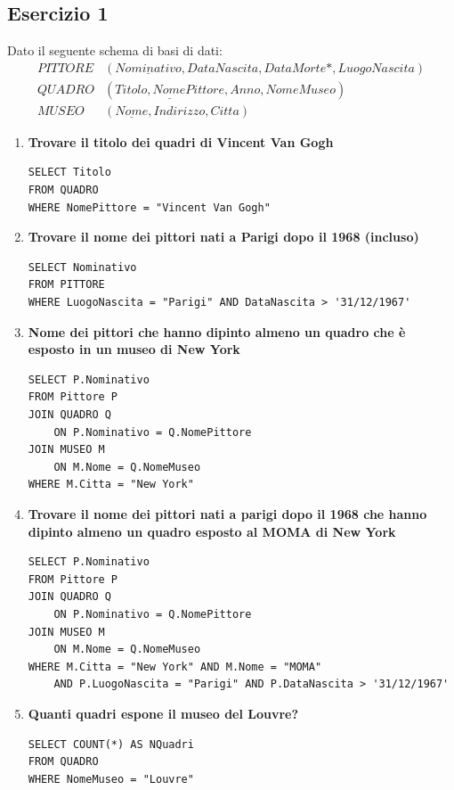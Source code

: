 \documentclass{article}
\begin{document}
\subsection{Esercizio 1}
Dato il seguente schema di basi di dati:
\begin{align*}
	PITTORE&(\underline{Nominativo}, DataNascita, DataMorte*,LuogoNascita)\\
	QUADRO&(\underline{Titolo,NomePittore}, Anno,NomeMuseo)\\
	MUSEO&(\underline{Nome}, Indirizzo, Citta)
\end{align*}

\begin{enumerate}
	\item \textbf{Trovare il titolo dei quadri di Vincent Van Gogh}
\begin{lstlisting}[style=sqlstyle]
SELECT Titolo
FROM QUADRO
WHERE NomePittore = "Vincent Van Gogh"
\end{lstlisting}
\item \textbf{Trovare il nome dei pittori nati a Parigi dopo il 1968 (incluso)}
\begin{lstlisting}[style=sqlstyle]
SELECT Nominativo
FROM PITTORE
WHERE LuogoNascita = "Parigi" AND DataNascita > '31/12/1967'
\end{lstlisting}

\item \textbf{Nome dei pittori che hanno dipinto almeno un quadro che è esposto in un museo di New York}
\begin{lstlisting}[style=sqlstyle]
SELECT P.Nominativo
FROM Pittore P
JOIN QUADRO Q 
	ON P.Nominativo = Q.NomePittore
JOIN MUSEO M
	ON M.Nome = Q.NomeMuseo
WHERE M.Citta = "New York"
\end{lstlisting}
\item \textbf{Trovare il nome dei pittori nati a parigi dopo il 1968 che hanno dipinto almeno un quadro esposto al MOMA di New York}
\begin{lstlisting}[style=sqlstyle]
SELECT P.Nominativo
FROM Pittore P
JOIN QUADRO Q 
	ON P.Nominativo = Q.NomePittore
JOIN MUSEO M
	ON M.Nome = Q.NomeMuseo
WHERE M.Citta = "New York" AND M.Nome = "MOMA"
	AND P.LuogoNascita = "Parigi" AND P.DataNascita > '31/12/1967'
\end{lstlisting}
\item \textbf{Quanti quadri espone il museo del Louvre?}
\begin{lstlisting}[style=sqlstyle]
SELECT COUNT(*) AS NQuadri
FROM QUADRO
WHERE NomeMuseo = "Louvre"
\end{lstlisting}


\end{enumerate}
\end{document}
